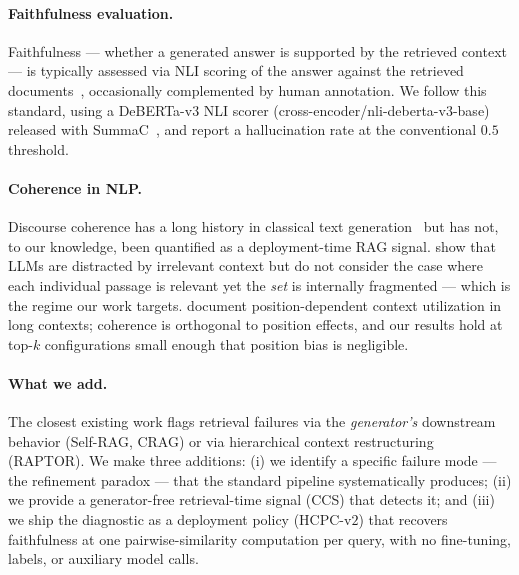 \paragraph{Faithfulness evaluation.}
Faithfulness --- whether a generated answer is supported by the
retrieved context --- is typically assessed via NLI scoring of the
answer against the retrieved documents~\citep{honovich2022true,laban2022summac,
es2024ragas}, occasionally complemented by human annotation. We
follow this standard, using a DeBERTa-v$3$ NLI scorer
(cross-encoder/nli-deberta-v$3$-base) released with
SummaC~\citep{laban2022summac}, and report a hallucination rate at
the conventional $0.5$ threshold.

\paragraph{Coherence in NLP.}
Discourse coherence has a long history in classical text
generation~\citep{li2014coherence,mesgar2018neural,nguyen2021conditional}
but has not, to our knowledge, been quantified as a deployment-time
RAG signal. \citet{shi2023large} show that LLMs are distracted by
irrelevant context but do not consider the case where each individual
passage is relevant yet the \emph{set} is internally fragmented ---
which is the regime our work targets. \citet{liu2024lostmiddle} document
position-dependent context utilization in long contexts; coherence is
orthogonal to position effects, and our results hold at top-$k$
configurations small enough that position bias is negligible.

\paragraph{What we add.}
The closest existing work flags retrieval failures via the
\emph{generator's} downstream behavior (Self-RAG, CRAG) or via
hierarchical context restructuring (RAPTOR). We make three additions:
(i) we identify a specific failure mode --- the refinement paradox ---
that the standard pipeline systematically produces; (ii) we provide a
generator-free retrieval-time signal (CCS) that detects it; and
(iii) we ship the diagnostic as a deployment policy (HCPC-v$2$) that
recovers faithfulness at one pairwise-similarity computation per
query, with no fine-tuning, labels, or auxiliary model calls.
